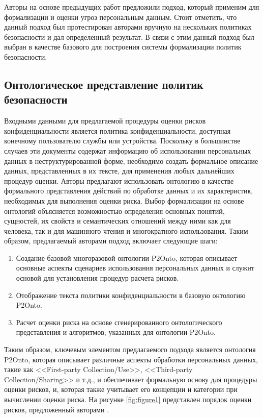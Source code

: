 \documentclass[../main]{subfiles}
\begin{document}
Авторы \cite{P2Onto} на основе предыдущих работ предложили подход, который применим для формализации и оценки угроз персональным данным. Стоит отметить, что данный подход был протестирован авторами вручную на нескольких политиках безопасности и дал определенный результат. В связи с этим данный подход был выбран в качестве базового для построения системы формализации политик безопасности.

\subsection{Онтологическое представление политик безопасности}

Входными данными для предлагаемой процедуры оценки рисков конфиденциальности является политика конфиденциальности, доступная конечному пользователю службы или устройства. Поскольку в большинстве случаев эти документы содержат информацию об использовании персональных данных в неструктурированной форме, необходимо создать формальное описание данных, представленных в их тексте, для применения любых дальнейших процедур оценки. Авторы \cite{P2Onto} предлагают использовать онтологию в качестве формального представления действий по обработке данных и их характеристик, необходимых для выполнения оценки риска. Выбор формализации на основе онтологий объясняется возможностью определения основных понятий, сущностей, их свойств и семантических отношений между ними как для человека, так и для машинного чтения и многократного использования. Таким образом, предлагаемый авторами подход включает следующие шаги: 
\begin{enumerate}
    \item Создание базовой многоразовой онтологии P2Onto, которая описывает основные аспекты сценариев использования персональных данных и служит основой для установления процедур расчета рисков. 
    \item Отображение текста политики конфиденциальности в базовую онтологию P2Onto. 
    \item Расчет оценки риска на основе сгенерированного онтологического представления и алгоритмов, указанных для онтологии P2Onto.
\end{enumerate}

Таким образом, ключевым элементом предлагаемого подхода является онтология P2Onto, которая описывает различные аспекты обработки персональных данных, такие как <<First-party Collection/Use>>, <<Third-party Collection/Sharing>> и т.д., и обеспечивает формальную основу для процедуры оценки рисков, и, которая также учитывает его концепции и категории при вычислении оценки риска. На рисунке \ref{fig:figure1} представлен порядок оценки рисков, предложенный авторами \cite{P2Onto}.
\end{document}
